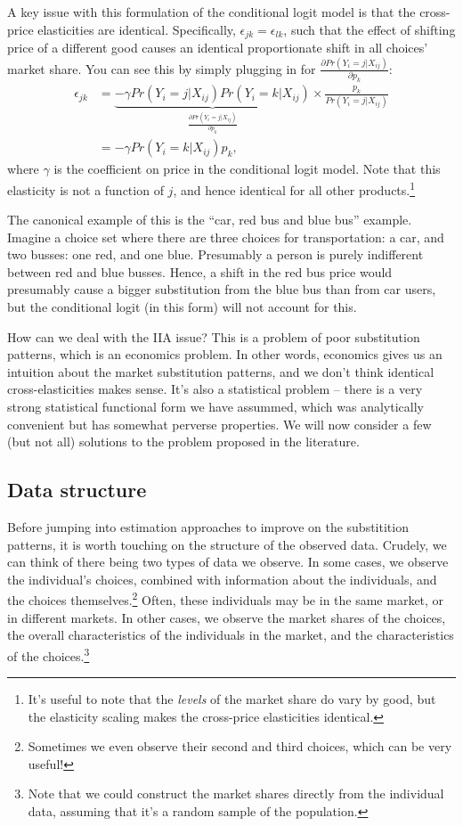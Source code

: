 \documentclass{tufte-handout}
\theoremstyle{break}
\begin{document}
A key issue with this formulation of the conditional logit model is that the cross-price elasticities are identical. Specifically, $\epsilon_{jk} = \epsilon_{lk}$, such that the effect of shifting price of a different good causes an identical proportionate shift in all choices' market share. You can see this by simply plugging in for $ \frac{\partial Pr(Y_{i} = j | X_{ij})}{\partial p_{k}}$:  \begin{align*}
            \epsilon_{jk} &= \underbrace{-\gamma Pr(Y_{i} = j|X_{ij} )Pr(Y_{i} = k | X_{ij} )}_{\frac{\partial Pr(Y_{i} = j | X_{ij} )}{\partial p_{k}}} \times \frac{p_{k}}{Pr(Y_{i} = j | X_{ij})}\\
                          &= -\gamma Pr(Y_{i} = k | X_{ij} )p_{k},
          \end{align*}
where $\gamma$ is the coefficient on price in the conditional logit model. Note that this elasticity is not a function of $j$, and hence identical for all other products.\footnote{It's useful to note that the \emph{levels} of the market share do vary by good, but the elasticity scaling makes the cross-price elasticities identical.} 

The canonical example of this is the ``car, red bus and blue bus'' example. Imagine a choice set where there are three choices for transportation: a car, and two busses: one red, and one blue.  Presumably a person is purely indifferent between red and blue busses. Hence, a shift in the red bus price would presumably cause a bigger substitution from the blue bus than from car users, but the conditional logit (in this form) will not account for this.

How can we deal with the IIA issue? This is a problem of poor substitution patterns, which is an economics problem. In other words, economics  gives us an intuition about the market substitution patterns, and we don't think identical cross-elasticities makes sense. It's also a statistical problem -- there is a very strong statistical functional form we have assummed, which was analytically convenient but has somewhat perverse properties. We will now consider a few (but not all) solutions to the problem proposed in the literature.

\subsection{Data structure}
Before jumping into estimation approaches to improve on the substitition patterns, it is worth touching on the structure of the observed data. Crudely, we can think of there being two types of data we observe. In some cases, we observe the individual's choices, combined with information about the individuals, and the choices themselves.\footnote{Sometimes we even observe their second and third choices, which can be very useful!} Often, these individuals may be in the same market, or in different markets. In other cases, we observe the market shares of the choices, the overall characteristics of the individuals in the market, and the characteristics of the choices.\footnote{Note that we could construct the market shares directly from the individual data, assuming that it's a random sample of the population.}
\end{document}
